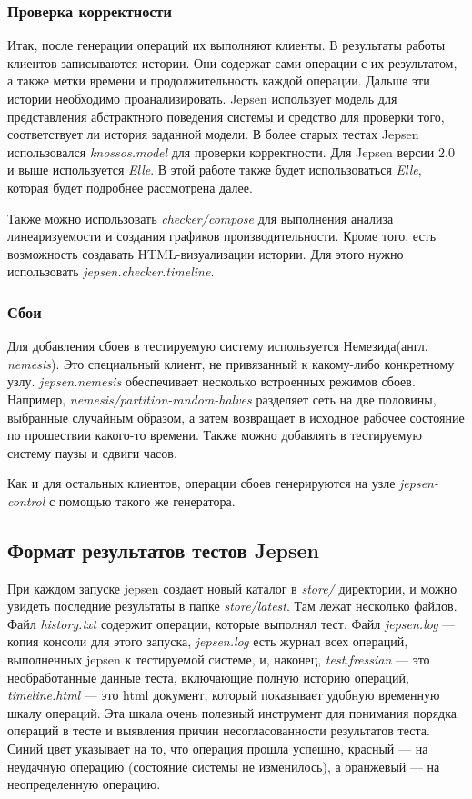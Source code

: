 \documentclass[12pt,  openany]{book}
\begin{document}
\subsubsection{Проверка корректности}
Итак, после генерации операций их выполняют клиенты. В результаты работы клиентов записываются истории. Они содержат сами операции с их результатом, а также метки времени и продолжительность каждой операции.  Дальше эти истории необходимо проанализировать. Jepsen использует модель для представления абстрактного поведения системы и средство для проверки того, соответствует ли история заданной модели.  В более старых тестах Jepsen использовался \textit{knossos.model} для проверки корректности.   Для Jepsen версии $2.0$ и выше используется \textit{Elle}. В этой работе также будет использоваться  \textit{Elle}, которая будет подробнее рассмотрена далее.
\par Также можно использовать \textit{checker/compose} для выполнения анализа линеаризуемости и создания графиков производительности. Кроме того, есть возможность создавать HTML-визуализации истории. Для этого нужно использовать \textit{jepsen.checker.timeline}.

\subsubsection{Сбои}
Для добавления сбоев в тестируемую систему используется Немезида(англ. \textit{nemesis}). Это специальный клиент, не привязанный к какому-либо конкретному узлу.  \textit{jepsen.nemesis} обеспечивает несколько встроенных режимов  сбоев.  Например, \textit{nemesis/partition-random-halves} разделяет сеть на две половины, выбранные случайным образом, а затем возвращает в исходное рабочее состояние по прошествии какого-то времени. Также можно добавлять в тестируемую систему паузы и сдвиги часов.
\par Как и для остальных клиентов, операции сбоев генерируются на узле \textit{jepsen-control} с помощью такого же генератора. 

\subsection{Формат результатов тестов Jepsen}
При каждом запуске jepsen создает новый каталог в \textit{store/} директории, и можно увидеть последние результаты в папке \textit{store/latest}. Там лежат несколько файлов.  Файл \textit{history.txt} содержит операции, которые выполнял тест.  Файл \textit{jepsen.log} --- копия консоли для этого запуска, \textit{jepsen.log} есть журнал всех операций, выполненных jepsen к тестируемой системе, и, наконец, \textit{test.fressian} --- это необработанные данные теста, включающие полную историю операций, \textit{timeline.html} --- это html документ, который показывает удобную временную шкалу операций. Эта шкала очень полезный инструмент для понимания порядка операций в тесте и выявления причин несогласованности результатов теста. Синий цвет указывает на то, что операция прошла успешно, красный --- на неудачную операцию (состояние системы не изменилось), а оранжевый --- на неопределенную операцию.
\end{document}
